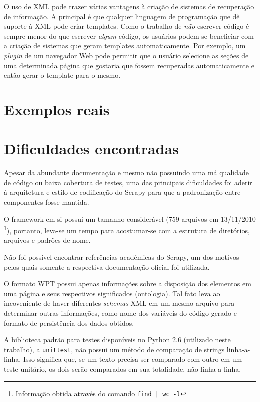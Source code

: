O uso de XML pode trazer várias vantagens à criação de sistemas de recuperação de informação. A principal é que qualquer linguagem de programação que dê suporte à XML pode criar templates. Como o trabalho de \emph{não} escrever código é sempre menor do que escrever \emph{algum} código, os usuários podem se beneficiar com a criação de sistemas que geram templates automaticamente. Por exemplo, um \emph{plugin} de um navegador Web pode permitir que o usuário selecione as seções de uma determinada página que gostaria que fossem recuperadas automaticamente e então gerar o template para o mesmo.

\section{Exemplos reais}

\pagebreak
\section{Dificuldades encontradas}

Apesar da abundante documentação e mesmo não possuindo uma má qualidade de código ou baixa cobertura de testes, uma das principais dificuldades foi aderir à arquitetura e estilo de codificação do Scrapy para que a padronização entre componentes fosse mantida.

O framework em si possui um tamanho considerável (759 arquivos em 13/11/2010 \footnote{Informação obtida através do comando \texttt{find | wc -l} }), portanto, leva-se um tempo para acostumar-se com a estrutura de diretórios, arquivos e padrões de nome.

Não foi possível encontrar referências acadêmicas do Scrapy, um dos motivos pelos quais somente a respectiva documentação oficial foi utilizada.

O formato WPT possui apenas informações sobre a disposição dos elementos em uma página e seus respectivos significados (ontologia). Tal fato leva ao incoveniente de haver diferentes \emph{schemas} XML em um mesmo arquivo para determinar outras informações, como nome dos variáveis do código gerado e formato de persistência dos dados obtidos.

A biblioteca padrão para testes disponíveis no Python 2.6 (utilizado neste trabalho), a \texttt{unittest}, não possui um método de comparação de strings linha-a-linha. Isso significa que, se um texto precisa ser comparado com outro em um teste unitário, os dois serão comparados em sua totalidade, não linha-a-linha. 

